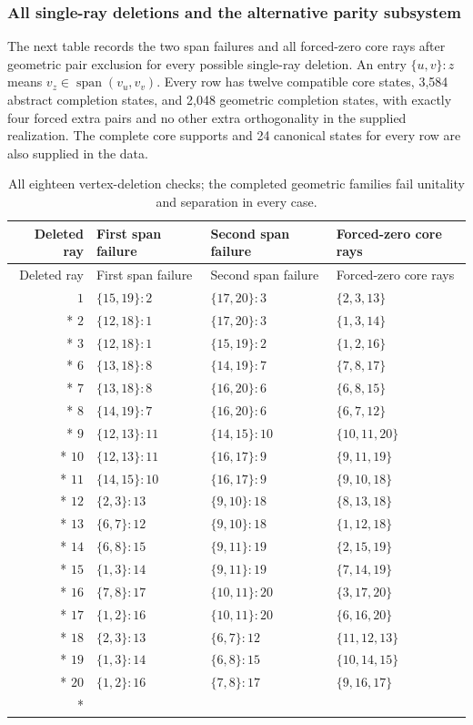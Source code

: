 \documentclass[aps,pra,reprint,superscriptaddress,longbibliography,nofootinbib,floatfix,10pt]{revtex4-2}
\theoremstyle{definition}
\begin{document}
\subsubsection{All single-ray deletions and the alternative parity subsystem}
The next table records the two span failures and all forced-zero core
rays after geometric pair exclusion for every possible single-ray
deletion. An entry $\{u,v\}:z$ means $v_z\in\operatorname{span}(v_u,v_v)$.
Every row has twelve compatible core states, 3{,}584 abstract completion
states, and 2{,}048 geometric completion states, with exactly four forced
extra pairs and no other extra orthogonality in the supplied realization.
The complete core supports and 24 canonical states for every row are
also supplied in the data.
\begingroup\small
{}
\begin{longtable}{rlll}
\caption{All eighteen vertex-deletion checks; the completed geometric families fail unitality and separation in every case.}\label{tab:cabello-vertex-deletions}\\
\toprule
Deleted ray & First span failure & Second span failure & Forced-zero core rays\\\midrule
\endfirsthead
\toprule
Deleted ray & First span failure & Second span failure & Forced-zero core rays\\\midrule
\endhead
\bottomrule\endfoot
$1$ & $\{15,19\}:2$ & $\{17,20\}:3$ & $\{2,3,13\}$\\*
$2$ & $\{12,18\}:1$ & $\{17,20\}:3$ & $\{1,3,14\}$\\*
$3$ & $\{12,18\}:1$ & $\{15,19\}:2$ & $\{1,2,16\}$\\*
$6$ & $\{13,18\}:8$ & $\{14,19\}:7$ & $\{7,8,17\}$\\*
$7$ & $\{13,18\}:8$ & $\{16,20\}:6$ & $\{6,8,15\}$\\*
$8$ & $\{14,19\}:7$ & $\{16,20\}:6$ & $\{6,7,12\}$\\*
$9$ & $\{12,13\}:11$ & $\{14,15\}:10$ & $\{10,11,20\}$\\*
$10$ & $\{12,13\}:11$ & $\{16,17\}:9$ & $\{9,11,19\}$\\*
$11$ & $\{14,15\}:10$ & $\{16,17\}:9$ & $\{9,10,18\}$\\*
$12$ & $\{2,3\}:13$ & $\{9,10\}:18$ & $\{8,13,18\}$\\*
$13$ & $\{6,7\}:12$ & $\{9,10\}:18$ & $\{1,12,18\}$\\*
$14$ & $\{6,8\}:15$ & $\{9,11\}:19$ & $\{2,15,19\}$\\*
$15$ & $\{1,3\}:14$ & $\{9,11\}:19$ & $\{7,14,19\}$\\*
$16$ & $\{7,8\}:17$ & $\{10,11\}:20$ & $\{3,17,20\}$\\*
$17$ & $\{1,2\}:16$ & $\{10,11\}:20$ & $\{6,16,20\}$\\*
$18$ & $\{2,3\}:13$ & $\{6,7\}:12$ & $\{11,12,13\}$\\*
$19$ & $\{1,3\}:14$ & $\{6,8\}:15$ & $\{10,14,15\}$\\*
$20$ & $\{1,2\}:16$ & $\{7,8\}:17$ & $\{9,16,17\}$\\*
\end{longtable}
\end{document}
